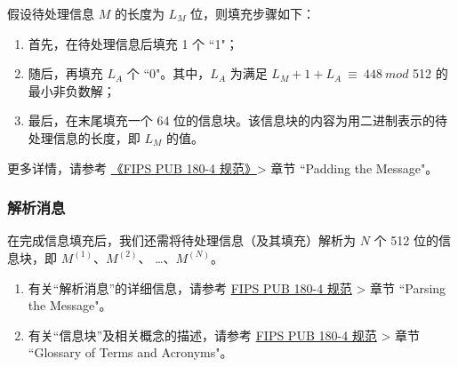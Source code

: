 \documentclass[main\_\_CN.tex]{subfiles}
\begin{document}
假设待处理信息 \begin{math} M \end{math} 的长度为 \begin{math}L_M\end{math} 位，则填充步骤如下：

\begin{enumerate}
    \item 首先，在待处理信息后填充 1 个 ``1"；
    \item 随后，再填充 \begin{math}L_A\end{math} 个 ``0"。其中，\begin{math}L_A\end{math} 为满足 \begin{math} L_M + 1 + L_A \ {\equiv} \ 448 \ mod \end{math} 512 的最小非负数解；
    \item 最后，在末尾填充一个 64 位的信息块。该信息块的内容为用二进制表示的待处理信息的长度，即 \begin{math}L_M\end{math} 的值。
\end{enumerate}

更多详情，请参考 \href{https://doi.org/10.6028/NIST.FIPS.180-4}{《FIPS PUB 180-4 规范》}> 章节 ``Padding the Message"。

\subsubsection{解析消息}\label{sec:ecdsa-msg-parsing}

在完成信息填充后，我们还需将待处理信息（及其填充）解析为 \begin{math}N\end{math} 个 512 位的信息块，即 \begin{math}M^{(1)}\end{math}、\begin{math}M^{(2)}\end{math}、 \dots、\begin{math}M^{(N)}\end{math}。

\begin{tiplisting}
\begin{enumerate}
\vspace{-2.5em}
    \item 有关“解析消息”的详细信息，请参考 \href{https://doi.org/10.6028/NIST.FIPS.180-4}{FIPS PUB 180-4 规范} > 章节 ``Parsing the Message"。
    \item 有关“信息块”及相关概念的描述，请参考 \href{https://doi.org/10.6028/NIST.FIPS.180-4}{FIPS PUB 180-4 规范} > 章节 ``Glossary of Terms and Acronyms"。
\end{enumerate}
\end{tiplisting}
\end{document}
